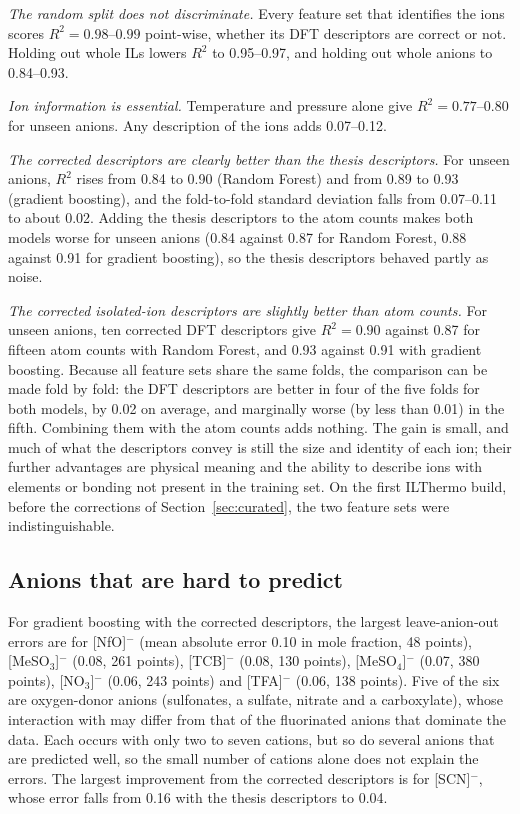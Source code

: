 \textit{The random split does not discriminate.} Every feature set that identifies the ions scores $R^2 = 0.98$--$0.99$ point-wise, whether its DFT descriptors are correct or not. Holding out whole ILs lowers $R^2$ to 0.95--0.97, and holding out whole anions to 0.84--0.93.

\textit{Ion information is essential.} Temperature and pressure alone give $R^2 = 0.77$--0.80 for unseen anions. Any description of the ions adds 0.07--0.12.

\textit{The corrected descriptors are clearly better than the thesis descriptors.} For unseen anions, $R^2$ rises from 0.84 to 0.90 (Random Forest) and from 0.89 to 0.93 (gradient boosting), and the fold-to-fold standard deviation falls from 0.07--0.11 to about 0.02. Adding the thesis descriptors to the atom counts makes both models worse for unseen anions (0.84 against 0.87 for Random Forest, 0.88 against 0.91 for gradient boosting), so the thesis descriptors behaved partly as noise.

\textit{The corrected isolated-ion descriptors are slightly better than atom counts.} For unseen anions, ten corrected DFT descriptors give $R^2 = 0.90$ against 0.87 for fifteen atom counts with Random Forest, and 0.93 against 0.91 with gradient boosting. Because all feature sets share the same folds, the comparison can be made fold by fold: the DFT descriptors are better in four of the five folds for both models, by 0.02 on average, and marginally worse (by less than 0.01) in the fifth. Combining them with the atom counts adds nothing. The gain is small, and much of what the descriptors convey is still the size and identity of each ion; their further advantages are physical meaning and the ability to describe ions with elements or bonding not present in the training set. On the first ILThermo build, before the corrections of Section~\ref{sec:curated}, the two feature sets were indistinguishable.

\subsection{Anions that are hard to predict}
For gradient boosting with the corrected descriptors, the largest leave-anion-out errors are for [NfO]$^-$ (mean absolute error 0.10 in mole fraction, 48 points), [MeSO$_3$]$^-$ (0.08, 261 points), [TCB]$^-$ (0.08, 130 points), [MeSO$_4$]$^-$ (0.07, 380 points), [NO$_3$]$^-$ (0.06, 243 points) and [TFA]$^-$ (0.06, 138 points). Five of the six are oxygen-donor anions (sulfonates, a sulfate, nitrate and a carboxylate), whose interaction with \co{} may differ from that of the fluorinated anions that dominate the data. Each occurs with only two to seven cations, but so do several anions that are predicted well, so the small number of cations alone does not explain the errors. The largest improvement from the corrected descriptors is for [SCN]$^-$, whose error falls from 0.16 with the thesis descriptors to 0.04.

